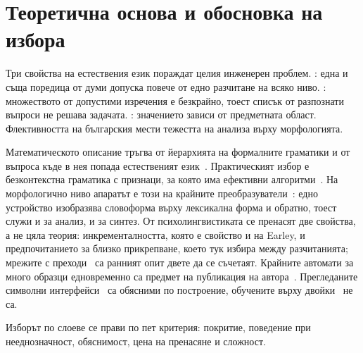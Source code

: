 \section{Теоретична основа и обосновка на избора}
\label{sec:theory}

Три свойства на естествения език пораждат целия инженерен проблем.
: една и съща поредица от думи допуска повече от едно разчитане на
всяко ниво. : множеството от допустими изречения е безкрайно, тоест
списък от разпознати въпроси не решава задачата. : значението
зависи от предметната област. Флективността на българския мести тежестта на анализа върху
морфологията.

Математическото описание тръгва от йерархията на формалните граматики и от въпроса къде в
нея попада естественият език~\cite{chomsky1957syntactic}. Практическият избор е
безконтекстна граматика с признаци, за която има ефективни
алгоритми~\cite{earley1970parsing,younger1967cyk}. На морфологично ниво апаратът е този на
крайните преобразуватели~\cite{beesley2003fsmorphology}: едно устройство изобразява
словоформа върху лексикална форма и обратно, тоест служи и за анализ, и за синтез. От
психолингвистиката се пренасят две свойства, а не цяла теория: инкременталността, която е
свойство и на Earley, и предпочитанието за близко прикрепване, което тук избира между
разчитанията; мрежите с преходи~\cite{woods1970atn} са ранният опит двете да се съчетаят. Крайните автомати за много образци едновременно са предмет на публикация на
автора~\cite{tsvetanov2024regex}. Прегледаните символни
интерфейси~\cite{androutsopoulos1995nlidb} са обясними по построение, обучените върху
двойки~\cite{zelle1996geoquery,yu2018spider} не са.

Изборът по слоеве се прави по пет критерия: покритие, поведение при нееднозначност,
обяснимост, цена на пренасяне и сложност.

